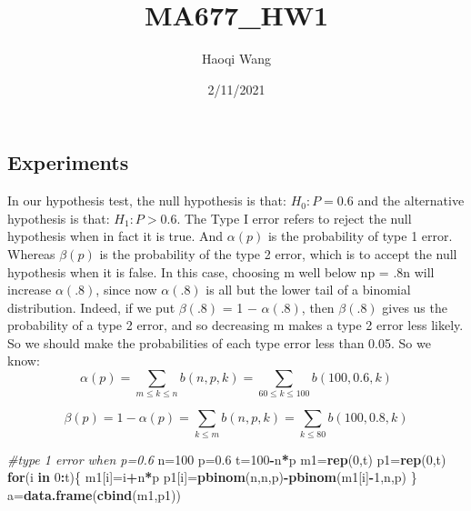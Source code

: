 \documentclass[
]{article}
\title{MA677\_HW1}
\author{Haoqi Wang}
\date{2/11/2021}
\newenvironment{Shaded}{\begin{snugshade}}{\end{snugshade}}
\newcommand{\CommentTok}[1]{\textcolor[rgb]{0.56,0.35,0.01}{\textit{#1}}}
\newcommand{\ControlFlowTok}[1]{\textcolor[rgb]{0.13,0.29,0.53}{\textbf{#1}}}
\newcommand{\DecValTok}[1]{\textcolor[rgb]{0.00,0.00,0.81}{#1}}
\newcommand{\FloatTok}[1]{\textcolor[rgb]{0.00,0.00,0.81}{#1}}
\newcommand{\KeywordTok}[1]{\textcolor[rgb]{0.13,0.29,0.53}{\textbf{#1}}}
\newcommand{\NormalTok}[1]{#1}
\newcommand{\OperatorTok}[1]{\textcolor[rgb]{0.81,0.36,0.00}{\textbf{#1}}}
\begin{document}
\maketitle

\hypertarget{experiments}{%
\subsection{Experiments}\label{experiments}}

In our hypothesis test, the null hypothesis is that: \(H_0:P=0.6\) and
the alternative hypothesis is that: \(H_1:P>0.6\). The Type I error
refers to reject the null hypothesis when in fact it is true. And
\(\alpha(p)\) is the probability of type 1 error. Whereas \(\beta(p)\)
is the probability of the type 2 error, which is to accept the null
hypothesis when it is false. In this case, choosing m well below np =
.8n will increase \(\alpha(.8)\), since now \(\alpha(.8)\) is all but
the lower tail of a binomial distribution. Indeed, if we put
\(\beta(.8)\) = 1 − \(\alpha(.8)\), then \(\beta(.8)\) gives us the
probability of a type 2 error, and so decreasing m makes a type 2 error
less likely. So we should make the probabilities of each type error less
than 0.05. So we know:
\[\alpha(p)=\sum_{m\le{k}\le{n}}b(n,p,k)=\sum_{60\le{k}\le{100}}b(100,0.6,k)\]

\[\beta(p)=1-\alpha(p)=\sum_{k\le{m}}b(n,p,k)=\sum_{k\le{80}}b(100,0.8,k)\]

\begin{Shaded}
\begin{Highlighting}[]
\CommentTok{#type 1 error when p=0.6}
\NormalTok{n=}\DecValTok{100}
\NormalTok{p=}\FloatTok{0.6}
\NormalTok{t=}\DecValTok{100}\OperatorTok{-}\NormalTok{n}\OperatorTok{*}\NormalTok{p}
\NormalTok{m1=}\KeywordTok{rep}\NormalTok{(}\DecValTok{0}\NormalTok{,t)}
\NormalTok{p1=}\KeywordTok{rep}\NormalTok{(}\DecValTok{0}\NormalTok{,t)}
\ControlFlowTok{for}\NormalTok{(i }\ControlFlowTok{in} \DecValTok{0}\OperatorTok{:}\NormalTok{t)\{}
\NormalTok{  m1[i]=i}\OperatorTok{+}\NormalTok{n}\OperatorTok{*}\NormalTok{p}
\NormalTok{  p1[i]=}\KeywordTok{pbinom}\NormalTok{(n,n,p)}\OperatorTok{-}\KeywordTok{pbinom}\NormalTok{(m1[i]}\OperatorTok{-}\DecValTok{1}\NormalTok{,n,p)}
\NormalTok{\}}
\NormalTok{a=}\KeywordTok{data.frame}\NormalTok{(}\KeywordTok{cbind}\NormalTok{(m1,p1))}
\end{Highlighting}
\end{Shaded}
\end{document}

